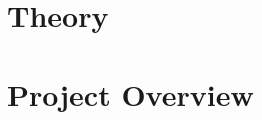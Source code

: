 
\pagebreak

\section{Theory}
    
    
    
    
    

\section{Project Overview}
    
    
    

\begin{appendices} \appendix
    
\end{appendices}

\printbibliography[heading=bibintoc,title={References}]
